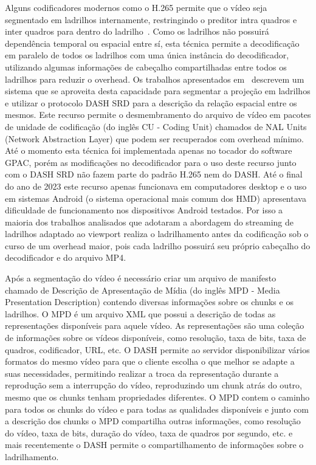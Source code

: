 Alguns codificadores modernos como o H.265 permite que o vídeo seja segmentado em ladrilhos internamente, restringindo o preditor intra quadros e inter quadros para dentro do ladrilho~\cite{ITU-T2018}. Como os ladrilhos não possuirá dependência temporal ou espacial entre sí, esta técnica permite a decodificação em paralelo de todos os ladrilhos com uma única instância do decodificador, utilizando algumas informações de cabeçalho compartilhadas entre todos os ladrilhos para reduzir o overhead. Os trabalhos apresentados em~\cite{Concolato2017, LeFeuvre2016} descrevem um sistema que se aproveita desta capacidade para segmentar a projeção em ladrilhos e utilizar o protocolo DASH SRD para a descrição da relação espacial entre os mesmos. Este recurso permite o desmembramento do arquivo de vídeo em pacotes de unidade de codificação (do inglês CU - Coding Unit) chamados de NAL Units (Network Abstraction Layer) que podem ser recuperados com overhead mínimo. Até o momento esta técnica foi implementada apenas no tocador do software GPAC, porém as modificações no decodificador para o uso deste recurso junto com o DASH SRD não fazem parte do padrão H.265 nem do DASH. Até o final do ano de 2023 este recurso apenas funcionava em computadores desktop e o uso em sistemas Android (o sistema operacional mais comum dos HMD) apresentava dificuldade de funcionamento nos dispositivos Android testados. Por isso a maioria dos trabalhos analisados que adotaram a abordagem do streaming de ladrilhos adaptado ao viewport realiza o ladrilhamento antes da codificação sob o curso de um overhead maior, pois cada ladrilho possuirá seu próprio cabeçalho do decodificador e do arquivo MP4.

Após a segmentação do vídeo é necessário criar um arquivo de manifesto chamado de Descrição de Apresentação de Mídia (do inglês MPD - Media Presentation Description) contendo diversas informações sobre os chunks e os ladrilhos. O MPD é um arquivo XML que possui a descrição de todas as representações disponíveis para aquele vídeo. As representações são uma coleção de informações sobre os vídeos disponíveis, como resolução, taxa de bits, taxa de quadros, codificador, URL, etc. O DASH permite ao servidor disponibilizar vários formatos do mesmo vídeo para que o cliente escolha o que melhor se adapte a suas necessidades, permitindo realizar a troca da representação durante a reprodução sem a interrupção do vídeo, reproduzindo um chunk atrás do outro, mesmo que os chunks tenham propriedades diferentes. O MPD contem o caminho para todos os chunks do vídeo e para todas as qualidades disponíveis e junto com a descrição dos chunks o MPD compartilha outras informações, como resolução do vídeo, taxa de bits, duração do vídeo, taxa de quadros por segundo, etc. e mais recentemente o DASH permite o compartilhamento de informações sobre o ladrilhamento.

